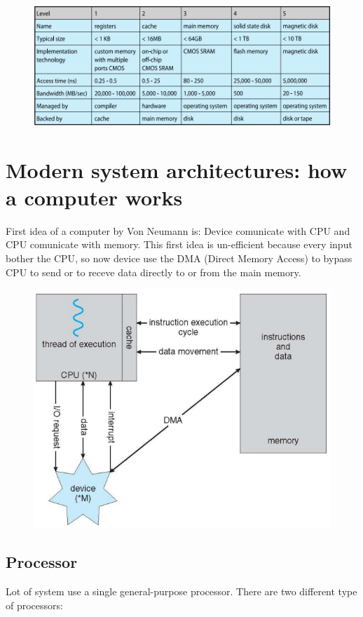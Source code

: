 \begin{figure}[htbp]
    \centering
    \includegraphics[scale=0.55]{img/stor.png}
\end{figure}

\newpage
\section{Modern system architectures: how a computer works}

First idea of a computer by Von Neumann is: Device comunicate with CPU and CPU comunicate with memory. This first idea is un-efficient because every input bother the CPU, so now device use the DMA (Direct Memory Access) to bypass CPU to send or to receve data directly to or from the main memory.

\begin{figure}[htbp]
    \centering
    \includegraphics[width=0.65\linewidth]{img/cpu.png}    
\end{figure}


\subsection{Processor}

Lot of system use a single general-purpose processor. 
There are two different type of processors:

